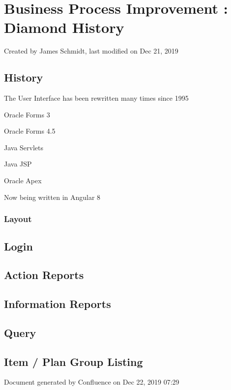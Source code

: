 \documentclass[letterpaper,10pt,english]{sphinxmanual}
\begin{document}
\section{Business Process Improvement : Diamond History}
\label{Introduction/Diamond-History:id1}
Created by James Schmidt, last modified on Dec 21, 2019


\subsection{History}
\label{Introduction/Diamond-History:history}
The User Interface has been rewritten many times since 1995

Oracle Forms 3

Oracle Forms 4.5

Java Servlets

Java JSP

Oracle Apex

Now being written in Angular 8


\subsubsection{Layout}
\label{Introduction/Diamond-History:layout}

\subsection{Login}
\label{Introduction/Diamond-History:login}

\subsection{Action Reports}
\label{Introduction/Diamond-History:action-reports}

\subsection{Information Reports}
\label{Introduction/Diamond-History:information-reports}

\subsection{Query}
\label{Introduction/Diamond-History:query}

\subsection{Item / Plan Group Listing}
\label{Introduction/Diamond-History:item-plan-group-listing}
Document generated by Confluence on Dec 22, 2019 07:29
\end{document}
